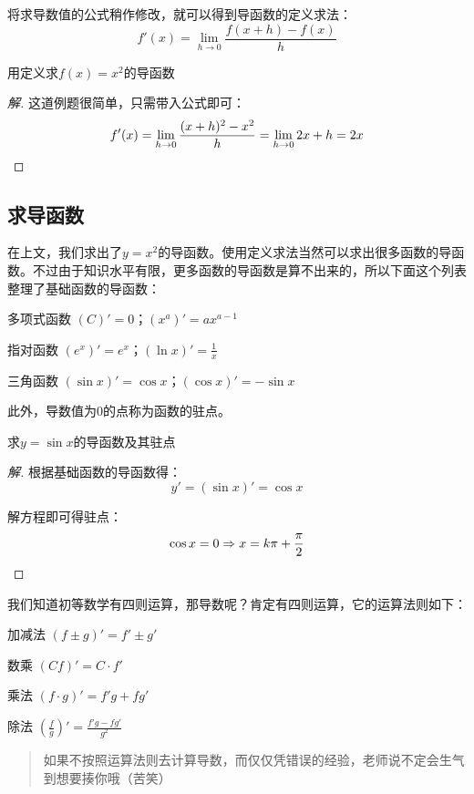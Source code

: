 将求导数值的公式稍作修改，就可以得到导函数的定义求法：\[f'(x)=\lim_{h\rightarrow 0}\frac{f(x+h)-f(x)}{h}\]

\begin{example}
	用定义求$f(x)=x^2$的导函数
\end{example}
\begin{proof}[解]
	这道例题很简单，只需带入公式即可：\[f'(x)=\lim_{h\rightarrow 0}\frac{(x+h)^2-x^2}{h}=\lim_{h\rightarrow 0}2x+h=2x\qedhere\]
\end{proof}

\subsection{求导函数}
在上文，我们求出了$y=x^2$的导函数。使用定义求法当然可以求出很多函数的导函数。不过由于知识水平有限，更多函数的导函数是算不出来的，所以下面这个列表整理了基础函数的导函数：

\begin{desclist}
	\item[多项式函数] $(C)'=0$；$(x^a)'=ax^{a-1}$
	\item[指对函数] $(e^x)'=e^x$；$(\ln x)'=\frac{1}{x}$
	\item[三角函数] $(\sin x)'=\cos x$；$(\cos x)'=-\sin x$
\end{desclist}

此外，导数值为$0$的点称为函数的驻点。

\begin{example}
	求$y=\sin x$的导函数及其驻点
\end{example}
\begin{proof}[解]
	根据基础函数的导函数得：\[y'=(\sin x)'=\cos x\]

	解方程即可得驻点：\[\cos x=0\Rightarrow x=k\pi+\frac{\pi}{2}\qedhere\]
\end{proof}

我们知道初等数学有四则运算，那导数呢？肯定有四则运算，它的运算法则如下：

\begin{desclist}
	\item[加减法] $(f\pm g)'=f'\pm g'$
	\item[数乘] $(Cf)'=C\cdot f'$
	\item[乘法] $(f\cdot g)'=f'g+fg'$
	\item[除法] $(\frac{f}{g})'=\frac{f'g-fg'}{g^2}$
\end{desclist}

\begin{quote}
	如果不按照运算法则去计算导数，而仅仅凭错误的经验，老师说不定会生气到想要揍你哦（苦笑）
\end{quote}

